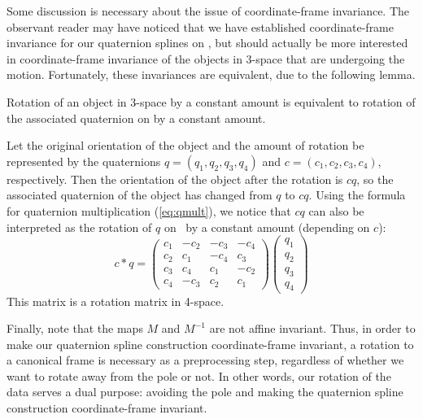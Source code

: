 Some discussion is necessary about the issue of 
coordinate-frame invariance.
The observant reader may have noticed that we have established
coordinate-frame invariance for our quaternion splines on ,
but should actually be more interested in coordinate-frame invariance 
of the objects in 3-space that are undergoing the motion.
Fortunately, these invariances are equivalent, due to the following lemma.
%
\begin{lemma}
Rotation of an object in 3-space by a constant amount
is equivalent to rotation of the associated quaternion on 
by a constant amount.
\end{lemma}
\prf
Let the original orientation of the object and the amount of
rotation be represented by the quaternions $q = (q_1,q_2,q_3,q_4)$ 
and $c = (c_1,c_2,c_3,c_4)$, respectively.
Then the orientation of the object after the rotation is $c q$,
so the associated quaternion of the object
has changed from $q$ to $c q$.
Using the formula for quaternion multiplication (\ref{eq:qmult}),
we notice that $c q$ can also be interpreted as the rotation 
of $q$ on \ by a constant amount (depending on $c$):
\[
c * q = \left( \begin{array}{cccc}
	c_1 & -c_2 & -c_3 & -c_4 \\
	c_2 &  c_1 & -c_4 &  c_3 \\
	c_3 &  c_4 &  c_1 & -c_2 \\
	c_4 & -c_3 &  c_2 &  c_1
	\end{array} \right)
	\left( \begin{array}{c}
	q_1 \\ q_2 \\ q_3 \\ q_4
	\end{array} \right)
\]
This matrix is a rotation matrix in 4-space.
\QED

Finally, note that the maps $M$ and $M^{-1}$ are not affine invariant.
Thus, in order to make our quaternion spline construction 
coordinate-frame invariant, a rotation to a canonical frame 
is necessary as a preprocessing step, regardless of whether we want 
to rotate away from the pole or not.
In other words, our rotation of the data serves a dual purpose:
avoiding the pole and making the quaternion spline construction
coordinate-frame invariant.

